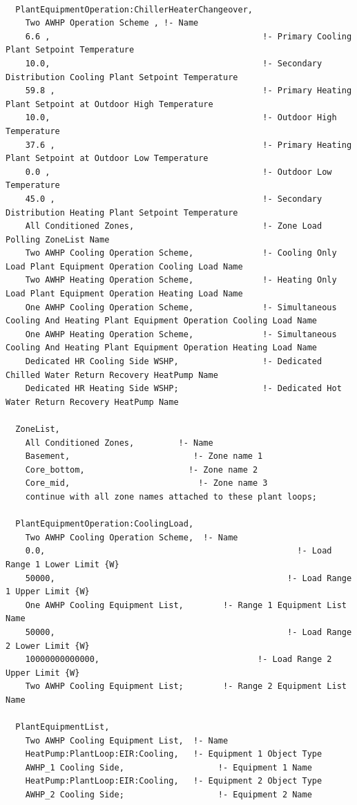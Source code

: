 \begin{lstlisting}

  PlantEquipmentOperation:ChillerHeaterChangeover,
    Two AWHP Operation Scheme , !- Name
    6.6 ,                                           !- Primary Cooling Plant Setpoint Temperature
    10.0,                                           !- Secondary Distribution Cooling Plant Setpoint Temperature
    59.8 ,                                          !- Primary Heating Plant Setpoint at Outdoor High Temperature
    10.0,                                           !- Outdoor High Temperature
    37.6 ,                                          !- Primary Heating Plant Setpoint at Outdoor Low Temperature
    0.0 ,                                           !- Outdoor Low Temperature
    45.0 ,                                          !- Secondary Distribution Heating Plant Setpoint Temperature
    All Conditioned Zones,                          !- Zone Load Polling ZoneList Name
    Two AWHP Cooling Operation Scheme,              !- Cooling Only Load Plant Equipment Operation Cooling Load Name
    Two AWHP Heating Operation Scheme,              !- Heating Only Load Plant Equipment Operation Heating Load Name
    One AWHP Cooling Operation Scheme,              !- Simultaneous Cooling And Heating Plant Equipment Operation Cooling Load Name
    One AWHP Heating Operation Scheme,              !- Simultaneous Cooling And Heating Plant Equipment Operation Heating Load Name
    Dedicated HR Cooling Side WSHP,                 !- Dedicated Chilled Water Return Recovery HeatPump Name
    Dedicated HR Heating Side WSHP;                 !- Dedicated Hot Water Return Recovery HeatPump Name

  ZoneList,
    All Conditioned Zones,         !- Name
    Basement,                         !- Zone name 1
    Core_bottom,                     !- Zone name 2
    Core_mid,                          !- Zone name 3
    continue with all zone names attached to these plant loops;

  PlantEquipmentOperation:CoolingLoad,
    Two AWHP Cooling Operation Scheme,  !- Name
    0.0,                                                   !- Load Range 1 Lower Limit {W}
    50000,                                               !- Load Range 1 Upper Limit {W}
    One AWHP Cooling Equipment List,        !- Range 1 Equipment List Name
    50000,                                               !- Load Range 2 Lower Limit {W}
    10000000000000,                                !- Load Range 2 Upper Limit {W}
    Two AWHP Cooling Equipment List;        !- Range 2 Equipment List Name

  PlantEquipmentList,
    Two AWHP Cooling Equipment List,  !- Name
    HeatPump:PlantLoop:EIR:Cooling,   !- Equipment 1 Object Type
    AWHP_1 Cooling Side,                   !- Equipment 1 Name
    HeatPump:PlantLoop:EIR:Cooling,   !- Equipment 2 Object Type
    AWHP_2 Cooling Side;                   !- Equipment 2 Name  
\end{lstlisting}


